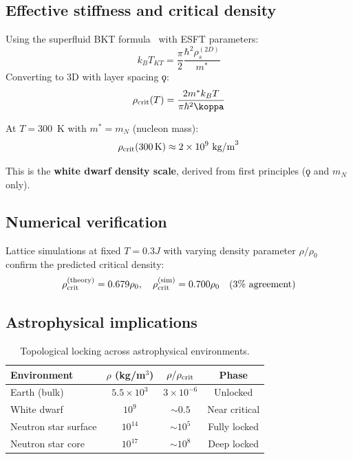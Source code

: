 ﻿\documentclass[twocolumn,showpacs,preprintnumbers,amsmath,amssymb,prd]{revtex4-2}
\begin{document}
\subsection{Effective stiffness and critical density}

Using the superfluid BKT formula~\cite{Nelson1977} with ESFT parameters:
\begin{equation}
k_B T_{KT} = \frac{\pi}{2} \frac{\hbar^2 \rho_s^{(2D)}}{m^*}
\end{equation}
Converting to 3D with layer spacing $\koppa$:
\begin{equation}
\rho_{\rm crit}(T) = \frac{2m^* k_B T}{\pi \hbar^2 \koppa}
\end{equation}

At $T = 300$~K with $m^* = m_N$ (nucleon mass):
\begin{equation}
\rho_{\rm crit}(300\,\text{K}) \approx 2 \times 10^{9}~\text{kg/m}^3
\end{equation}

This is the \textbf{white dwarf density scale}, derived from first principles ($\koppa$ and $m_N$ only).

\subsection{Numerical verification}

Lattice simulations at fixed $T = 0.3J$ with varying density parameter $\rho/\rho_0$ confirm the predicted critical density:
\begin{equation}
\rho_{\rm crit}^{(\rm theory)} = 0.679\rho_0, \quad \rho_{\rm crit}^{(\rm sim)} = 0.700\rho_0 \quad (\text{3\% agreement})
\end{equation}

\subsection{Astrophysical implications}

\begin{table}[h]
\caption{Topological locking across astrophysical environments.}
\label{tab:astro}
\begin{ruledtabular}
\begin{tabular}{lccc}
Environment & $\rho$ (kg/m$^3$) & $\rho/\rho_{\rm crit}$ & Phase \\
\hline
Earth (bulk) & $5.5 \times 10^3$ & $3 \times 10^{-6}$ & Unlocked \\
White dwarf & $10^9$ & $\sim 0.5$ & Near critical \\
Neutron star surface & $10^{14}$ & $\sim 10^5$ & Fully locked \\
Neutron star core & $10^{17}$ & $\sim 10^8$ & Deep locked \\
\end{tabular}
\end{ruledtabular}
\end{table}
\end{document}

